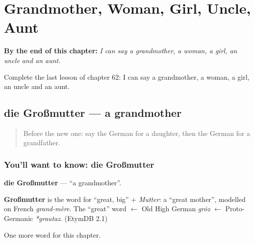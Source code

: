 
\chapter{Grandmother, Woman, Girl, Uncle, Aunt}
\label{ch:ge-grandmother-woman-girl-uncle-aunt}

\begin{chapteropening}
\textbf{By the end of this chapter:} \emph{I can say a grandmother, a woman, a girl, an uncle and an aunt.}

Complete the last lesson of chapter 62: I can say a grandmother, a woman, a girl, an uncle and an aunt.
\end{chapteropening}

\section[die Großmutter]{die Großmutter — a grandmother}

\label{lesson:GE-C62-grossmutter}



\begin{quote}
Before the new one: say the German for a daughter, then the German for a grandfather.
\end{quote}

\subsection*{You'll want to know: die Großmutter}
\textbf{die Großmutter} — \textquotedblleft{}a grandmother\textquotedblright{}.

\begin{cousinweb}
\textbf{Großmutter} is the word for \textquotedblleft{}great, big\textquotedblright{} + \emph{Mutter}: a \textquotedblleft{}great mother\textquotedblright{}, modelled on French \emph{grand-mère}. The \textquotedblleft{}great\textquotedblright{} word $\leftarrow$ Old High German \emph{grōz} $\leftarrow$ Proto-Germanic \emph{*grautaz}. (EtymDB 2.1)
\end{cousinweb}

\begin{grammarlens}[title={What you've built}]
One more word for this chapter.
\end{grammarlens}

